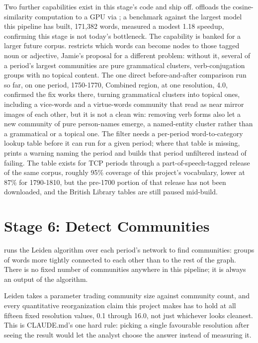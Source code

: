 \documentclass[11pt]{article}
\begin{document}
Two further capabilities exist in this stage's code and ship off.
 offloads the cosine-similarity computation to a GPU via
; a benchmark against the largest model this pipeline has
built, 171{,}382 words, measured a modest 1.18\texttimes{} speedup,
confirming this stage is not today's bottleneck. The capability is
banked for a larger future corpus.  restricts which
words can become nodes to those tagged noun or adjective, Jamie's
proposal for a different problem: without it, several of a period's
largest communities are pure grammatical clusters, verb-conjugation
groups with no topical content. The one direct before-and-after
comparison run so far, on one period, 1750-1770, Combined region, at one
resolution, 4.0, confirmed the fix works there, turning grammatical
clusters into topical ones, including a vice-words and a virtue-words
community that read as near mirror images of each other, but it is not
a clean win: removing verb forms also let a new community of pure
person-names emerge, a named-entity cluster rather than a grammatical or
a topical one. The filter needs a per-period word-to-category lookup
table before it can run for a given period; where that table is
missing,  prints a warning naming the period and builds
that period unfiltered instead of failing. The table exists for TCP
periods through a part-of-speech-tagged release of the same corpus,
roughly 95\% coverage of this project's vocabulary, lower at 87\% for
1790-1810, but the pre-1700 portion of that release has not been
downloaded, and the British Library tables are still paused mid-build.

\section{Stage 6: Detect Communities}
\label{sec:communities}

 runs the Leiden algorithm over each period's
network to find communities: groups of words more tightly connected to
each other than to the rest of the graph. There is no fixed number of
communities anywhere in this pipeline; it is always an output of the
algorithm.

Leiden takes a  parameter trading community size
against community count, and every quantitative reorganization claim
this project makes has to hold at all fifteen fixed resolution values,
0.1 through 16.0, not just whichever looks cleanest. This is CLAUDE.md's
one hard rule: picking a single favourable resolution after seeing the
result would let the analyst choose the answer instead of measuring it.
\end{document}
